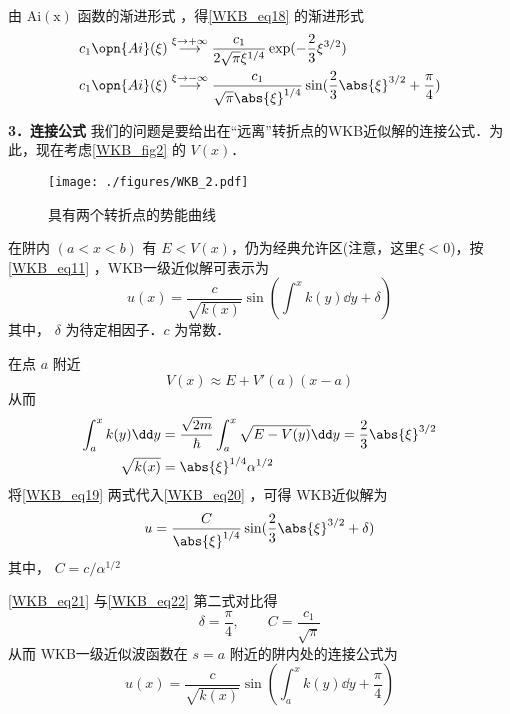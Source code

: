 由 $\mathrm{Ai(x)}$ 函数的渐进形式 ，得\autoref{WKB_eq18} 的渐进形式
\begin{equation}\label{WKB_eq22}
\begin{aligned}
&c_1\opn{Ai}(\xi) \overset{\xi \to +\infty}{\longrightarrow} \frac{c_1}{2\sqrt{\pi} \xi^{1/4}} \exp(-\frac{2}{3}\xi^{3/2})\\
&c_1\opn{Ai}(\xi) \overset{\xi \to -\infty}{\longrightarrow} \frac{c_1}{\sqrt{\pi} \abs{\xi}^{1/4}} \sin(\frac{2}{3}\abs{\xi}^{3/2}+\frac{\pi}{4})\\
\end{aligned}
\end{equation}

\textbf{3．连接公式}
我们的问题是要给出在“远离”转折点的WKB近似解的连接公式．为此，现在考虑\autoref{WKB_fig2} 的 $V(x)$．
\begin{figure}[ht]
\centering
\texttt{[image: ./figures/WKB\_2.pdf]}
\caption{具有两个转折点的势能曲线} \label{WKB_fig2}
\end{figure}
在阱内 $(a<x<b)$ 有 $E<V(x)$，仍为经典允许区(注意，这里$\xi<0$)，按\autoref{WKB_eq11} ，WKB一级近似解可表示为
\begin{equation}\label{WKB_eq20}
u(x)=\frac{c}{\sqrt{k(x)}}\sin(\int^x k(y)\dd y+\delta)
\end{equation}
其中， $\delta$ 为待定相因子．$c$ 为常数．

在点 $a$ 附近
\begin{equation}
V(x)\approx E+V'(a)(x-a)
\end{equation}
从而
\begin{equation}\label{WKB_eq19}
\begin{aligned}
\int_a^xk(y)\dd y&=
\frac{\sqrt{2m}}{\hbar}\int_a^x\sqrt{E-V(y)}\dd y=\frac{2}{3}\abs{\xi}^{3/2}
\\
\sqrt{k(x)}
&=
\abs{\xi}^{1/4}\alpha^{1/2}
\end{aligned}
\end{equation}
将\autoref{WKB_eq19} 两式代入\autoref{WKB_eq20} ，可得 WKB近似解为
\begin{equation}\label{WKB_eq21}
u=
\frac{C}{\abs{\xi}^{1/4}}\sin({\frac{2}{3}\abs{\xi}^{3/2}+\delta})
\end{equation}
其中， $C=c/\alpha^{1/2}$

\autoref{WKB_eq21} 与\autoref{WKB_eq22} 第二式对比得
\begin{equation}\label{WKB_eq25}
\delta=\frac{\pi}{4},\qquad C=\frac{c_1}{\sqrt{\pi}}
\end{equation}
从而 WKB一级近似波函数在 $s=a$ 附近的阱内处的连接公式为
\begin{equation}
u(x)=\frac{c}{\sqrt{k(x)}}\sin(\int_a^x k(y)\dd y+\frac{\pi}{4})
\end{equation}


